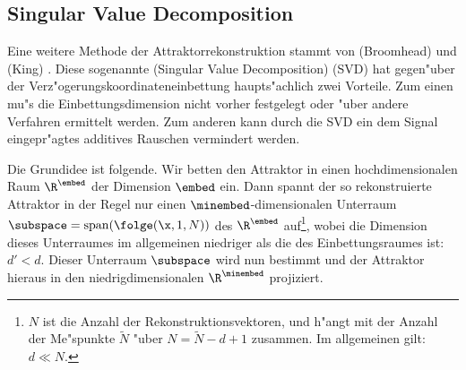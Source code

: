 \subsection{Singular Value Decomposition}
\label{chapsvd}
Eine weitere Methode der Attraktorrekonstruktion stammt von \autor(Broomhead) und
\autor(King) \cite{Broomhead-king}. Diese sogenannte \begriff(Singular Value
Decomposition) (SVD) hat gegen"uber der Verz"ogerungskoordinateneinbettung haupts"achlich
zwei Vorteile. Zum einen mu"s die Einbettungsdimension nicht vorher festgelegt oder "uber
andere Verfahren ermittelt werden. Zum anderen kann durch die SVD ein dem Signal
eingepr"agtes additives Rauschen vermindert werden.

Die Grundidee ist folgende. Wir betten den Attraktor in einen hochdimensionalen Raum
$\R^\embed$ der Dimension $\embed$ ein. Dann spannt der so rekonstruierte Attraktor
in der Regel nur einen $\minembed$-dimensio\-nalen Unterraum
$\subspace=\mathop{\mathrm{span}}(\folge(\x,1,N))$  des
$\R^\embed$ auf\footnote{$N$ ist die Anzahl der Rekonstruktionsvektoren,
  und h"angt mit der Anzahl der Me"spunkte $\tilde N$ "uber $N=\tilde N-d+1$ zusammen. Im allgemeinen
  gilt: $d\ll N$.}, wobei die Dimension dieses Unterraumes im allgemeinen niedriger
als die des Einbettungsraumes ist: $d'<d$.  Dieser Unterraum $\subspace$ wird nun bestimmt und der
Attraktor hieraus in den niedrigdimensionalen $\R^\minembed$ projiziert.

